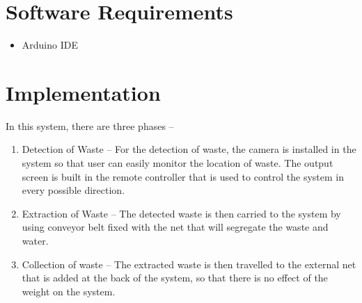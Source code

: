 \documentclass{article}
\begin{document}
\section{Software Requirements}
\begin{itemize}
	\item Arduino IDE
\newline
\newline
\end{itemize}


\section{Implementation}
In this system, there are three phases –
\newline
\begin{enumerate}
	\item Detection of Waste – For the detection of waste, the camera is installed in the system so that user can easily monitor the location of waste. The output screen is built in the remote controller that is used to control the system in every possible direction.
	\item Extraction of Waste – The detected waste is then carried to the system by using conveyor belt fixed with the net that will segregate the waste and water.
	\item Collection of waste – The extracted waste is then travelled to the external net that is added at the back of the system, so that there is no effect of the weight on the system.
\end{enumerate}

\newpage
\end{document}
